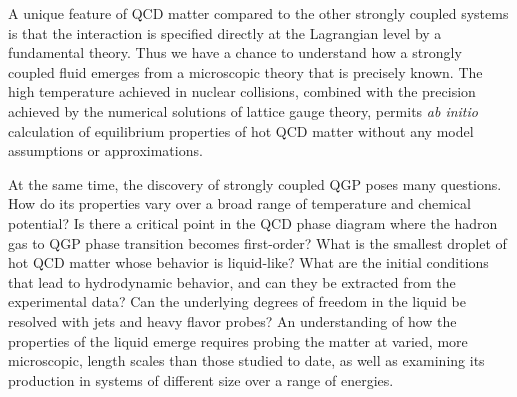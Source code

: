 A unique feature of QCD matter compared to the other strongly coupled systems is that the interaction is specified directly at the Lagrangian level by a fundamental theory. Thus we have a chance to understand how a strongly coupled fluid emerges from a microscopic theory that is precisely known. The high temperature achieved in nuclear collisions, combined with the precision achieved by the numerical solutions of lattice gauge theory, permits {\em ab initio} calculation of equilibrium properties of hot QCD matter without any model assumptions or approximations.

At the same time, the discovery of strongly coupled QGP poses many questions. How do its properties vary over a broad range of temperature and chemical potential?
Is there a critical point in the QCD phase diagram where the hadron gas to QGP phase transition becomes first-order?  What is the smallest droplet of hot QCD matter whose behavior is liquid-like? What are the initial conditions that lead to hydrodynamic behavior, and can they be extracted from the experimental data? Can the underlying degrees of freedom in the liquid be resolved with jets and heavy flavor probes? An understanding of how the properties of the liquid emerge requires probing the matter at varied, more microscopic, length scales than those studied to date, as well as examining its production in systems of different size over a range of energies.

